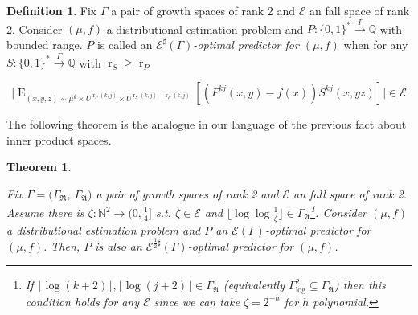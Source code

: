\documentclass{article}
\theoremstyle{definition}
\newtheorem{definition}{Definition}[section]
\theoremstyle{plain}
\newtheorem{theorem}{Theorem}[section]
\newcommand{\Words}{{\{ 0, 1 \}^*}}
\DeclareMathOperator{\E}{E}
\DeclareMathOperator{\R}{r}
\newcommand{\Nats}{\mathbb{N}}
\newcommand{\Rats}{\mathbb{Q}}
\newcommand{\Abs}[1]{\lvert #1 \rvert}
\newcommand{\Floor}[1]{\lfloor #1 \rfloor}
\begin{document}
\begin {definition}

Fix $\Gamma$ a pair of growth spaces of rank 2 and $\mathcal{E}$ an fall space of rank 2. Consider $(\mu,f)$ a distributional estimation problem and $P: \Words \xrightarrow{\Gamma} \Rats$ with bounded range. $P$ is called an \emph{$\mathcal{E}^\sharp(\Gamma)$-optimal predictor for $(\mu,f)$} when for any $S: \Words \xrightarrow{\Gamma} \Rats$ with $\R_S \geq \R_P$

\begin{equation}
\Abs{\E_{(x,y,z) \sim \mu^k \times U^{\R_P(k,j)} \times U^{\R_S(k,j)-\R_P(k,j)}}[(P^{kj}(x,y) - f(x))S^{kj}(x,yz)]} \in \mathcal{E}
\end{equation}

\end {definition}

The following theorem is the analogue in our language of the previous fact about inner product spaces.

\begin{theorem}
\label{thm:ort}

Fix $\Gamma=(\Gamma_{\mathfrak{R}}$, $\Gamma_{\mathfrak{A}})$ a pair of growth spaces of rank 2 and $\mathcal{E}$ an fall space of rank 2. Assume there is $\zeta: \Nats^2 \rightarrow (0,\frac{1}{4}]$ s.t. $\zeta \in \mathcal{E}$ and $\Floor{\log \log \frac{1}{\zeta}} \in \Gamma_{\mathfrak{A}}$\footnote{If $\Floor{\log(k+2)}, \Floor{\log(j+2)} \in \Gamma_{\mathfrak{A}}$ (equivalently $\Gamma_{\text{log}}^2 \subseteq \Gamma_{\mathfrak{A}}$) then this condition holds for any $\mathcal{E}$ since we can take $\zeta = 2^{-h}$ for $h$ polynomial.}. Consider $(\mu,f)$ a distributional estimation problem and $P$ an $\mathcal{E}(\Gamma)$-optimal predictor for $(\mu,f)$. Then, $P$ is also an $\mathcal{E}^{\frac{1}{2}\sharp}(\Gamma)$-optimal predictor for $(\mu,f)$.

\end{theorem}
\end{document}

